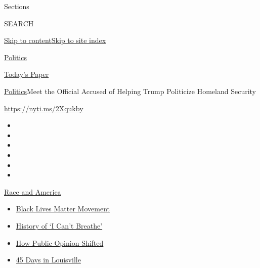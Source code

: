 Sections

SEARCH

\protect\hyperlink{site-content}{Skip to
content}\protect\hyperlink{site-index}{Skip to site index}

\href{https://www.nytimes.com/section/politics}{Politics}

\href{https://myaccount.nytimes.com/auth/login?response_type=cookie\&client_id=vi}{}

\href{https://www.nytimes.com/section/todayspaper}{Today's Paper}

\href{/section/politics}{Politics}\textbar{}Meet the Official Accused of
Helping Trump Politicize Homeland Security

\url{https://nyti.ms/2Xqukby}

\begin{itemize}
\item
\item
\item
\item
\item
\item
\end{itemize}

\href{https://www.nytimes.com/news-event/george-floyd-protests-minneapolis-new-york-los-angeles?action=click\&pgtype=Article\&state=default\&region=TOP_BANNER\&context=storylines_menu}{Race
and America}

\begin{itemize}
\tightlist
\item
  \href{https://www.nytimes.com/interactive/2020/07/03/us/george-floyd-protests-crowd-size.html?action=click\&pgtype=Article\&state=default\&region=TOP_BANNER\&context=storylines_menu}{Black
  Lives Matter Movement}
\item
  \href{https://www.nytimes.com/interactive/2020/06/28/us/i-cant-breathe-police-arrest.html?action=click\&pgtype=Article\&state=default\&region=TOP_BANNER\&context=storylines_menu}{History
  of `I Can't Breathe'}
\item
  \href{https://www.nytimes.com/interactive/2020/06/10/upshot/black-lives-matter-attitudes.html?action=click\&pgtype=Article\&state=default\&region=TOP_BANNER\&context=storylines_menu}{How
  Public Opinion Shifted}
\item
  \href{https://www.nytimes.com/interactive/2020/07/16/us/black-lives-matter-protests-louisville-breonna-taylor.html?action=click\&pgtype=Article\&state=default\&region=TOP_BANNER\&context=storylines_menu}{45
  Days in Louisville}
\end{itemize}

